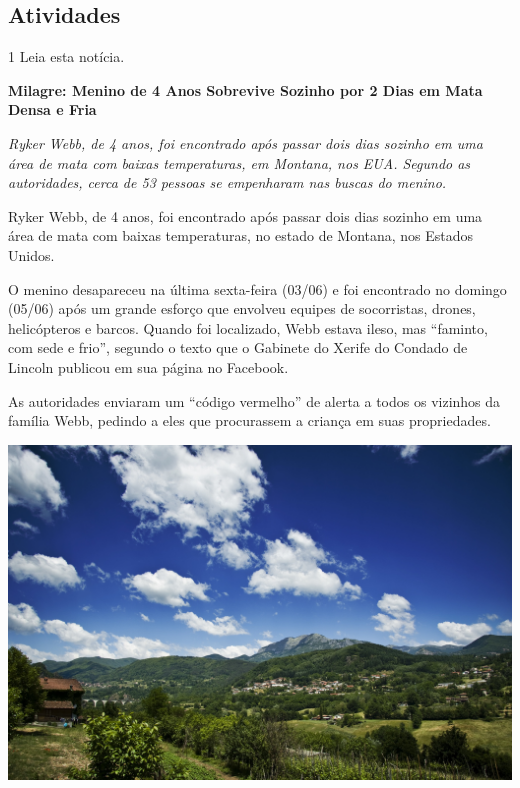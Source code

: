 \begin{conteudo}
\begin{conteudo}
\begin{conteudo}
\begin{conteudo}
\section*{Atividades}

\num{1} Leia esta notícia.



\begin{myquote}
\textbf{Milagre: Menino de 4 Anos Sobrevive Sozinho por 2 Dias em Mata Densa e Fria}

\emph{Ryker Webb, de 4 anos, foi encontrado após passar dois dias
sozinho em uma área de mata com baixas temperaturas, em Montana, nos
EUA. Segundo as autoridades, cerca de 53 pessoas se empenharam nas
buscas do menino.}

Ryker Webb, de 4 anos, foi encontrado após passar dois dias sozinho em
uma área de mata com baixas temperaturas, no estado de Montana, nos
Estados Unidos.

O menino desapareceu na última sexta-feira (03/06) e foi encontrado no
domingo (05/06) após um grande esforço que envolveu equipes de
socorristas, drones, helicópteros e barcos. Quando foi localizado, Webb
estava ileso, mas ``faminto, com sede e frio'', segundo o texto que o
Gabinete do Xerife do Condado de Lincoln publicou em sua página no
Facebook.

As autoridades enviaram um ``código vermelho'' de alerta a todos os
vizinhos da família Webb, pedindo a eles que procurassem a criança em
suas propriedades.

\begin{center}
\noindent\includegraphics[width=\textwidth]{media/image20b.jpg}
\end{center}


\end{myquote}
\end{conteudo}
\end{conteudo}
\end{conteudo}
\end{conteudo}
